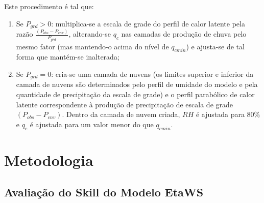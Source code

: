 Este procedimento é tal que:

\begin{enumerate}
\item Se $P_{grd}>0$: multiplica-se a escala de grade do perfil de calor latente pela razão $\frac{(P_{obs}-P_{cnv})}{P_{grd}}$, alterando-se $q_{c}$ nas camadas de produção de chuva pelo mesmo fator (mas mantendo-o acima do nível de $q_{cmin}$) e ajusta-se de tal forma que mantém-se inalterada;
\item Se $P_{grd}=0$: cria-se uma camada de nuvens (os limites superior e inferior da camada de nuvens são determinados pelo perfil de umidade do modelo e pela quantidade de precipitação da escala de grade) e o perfil parabólico de calor latente correspondente à produção de precipitação de escala de grade $(P_{obs}-P_{cnv})$. Dentro da camada de nuvem criada, $RH$ é ajustada para 80\% e $q_{c}$ é ajustada para um valor menor do que $q_{cmin}$.
\end{enumerate}

\section{Metodologia}
\label{ss:metodologia}

\subsection{Avaliação do Skill do Modelo EtaWS}


